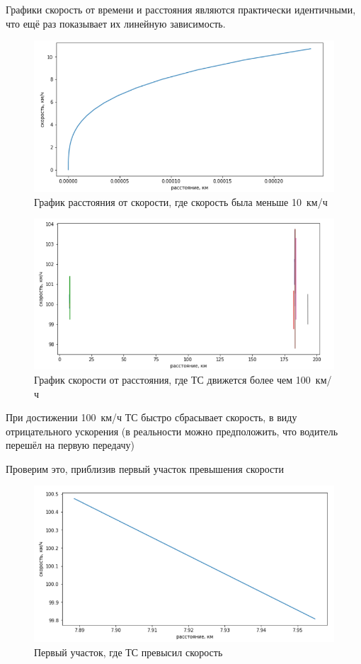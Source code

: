 \documentclass[A4paper,12pt]{article}
\theoremstyle{plain} %
\theoremstyle{definition} %
\theoremstyle{remark} %
\begin{document}
 Графики скорость от времени и расстояния являются практически идентичными, что ещё раз показывает их линейную зависимость.
 
 \begin{figure}[h!]
     \centering
     \includegraphics[scale = 0.95]{Скорость10.png}
     \caption{График расстояния от скорости, где скорость была меньше 10~км/ч}
 \end{figure}
 
 \begin{figure}[h!]
     \centering
     \includegraphics[scale = 0.8]{скорость100.png}
     \caption{График скорости от расстояния, где ТС движется более чем 100~км/ч}
 \end{figure}
 
 При достижении 100~км/ч ТС быстро сбрасывает скорость, в виду отрицательного ускорения (в реальности можно предположить, что водитель перешёл на первую передачу)
 
 Проверим это, приблизив первый участок превышения скорости
 \begin{figure}[h!]
     \centering
     \includegraphics[scale = 0.7]{Скорость100один.png}
     \caption{Первый участок, где ТС превысил скорость}
 \end{figure}
 
\end{document}
